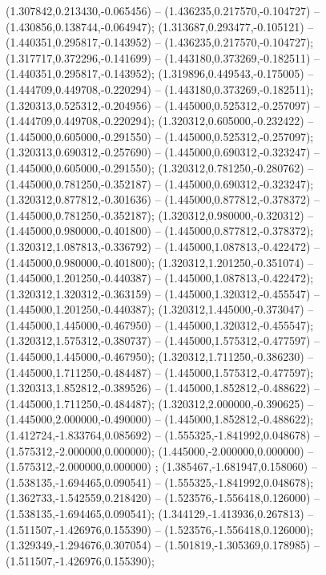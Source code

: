  (1.307842,0.213430,-0.065456) -- (1.436235,0.217570,-0.104727) -- (1.430856,0.138744,-0.064947);
 (1.313687,0.293477,-0.105121) -- (1.440351,0.295817,-0.143952) -- (1.436235,0.217570,-0.104727);
 (1.317717,0.372296,-0.141699) -- (1.443180,0.373269,-0.182511) -- (1.440351,0.295817,-0.143952);
 (1.319896,0.449543,-0.175005) -- (1.444709,0.449708,-0.220294) -- (1.443180,0.373269,-0.182511);
 (1.320313,0.525312,-0.204956) -- (1.445000,0.525312,-0.257097) -- (1.444709,0.449708,-0.220294);
 (1.320312,0.605000,-0.232422) -- (1.445000,0.605000,-0.291550) -- (1.445000,0.525312,-0.257097);
 (1.320313,0.690312,-0.257690) -- (1.445000,0.690312,-0.323247) -- (1.445000,0.605000,-0.291550);
 (1.320312,0.781250,-0.280762) -- (1.445000,0.781250,-0.352187) -- (1.445000,0.690312,-0.323247);
 (1.320312,0.877812,-0.301636) -- (1.445000,0.877812,-0.378372) -- (1.445000,0.781250,-0.352187);
 (1.320312,0.980000,-0.320312) -- (1.445000,0.980000,-0.401800) -- (1.445000,0.877812,-0.378372);
 (1.320312,1.087813,-0.336792) -- (1.445000,1.087813,-0.422472) -- (1.445000,0.980000,-0.401800);
 (1.320312,1.201250,-0.351074) -- (1.445000,1.201250,-0.440387) -- (1.445000,1.087813,-0.422472);
 (1.320312,1.320312,-0.363159) -- (1.445000,1.320312,-0.455547) -- (1.445000,1.201250,-0.440387);
 (1.320312,1.445000,-0.373047) -- (1.445000,1.445000,-0.467950) -- (1.445000,1.320312,-0.455547);
 (1.320312,1.575312,-0.380737) -- (1.445000,1.575312,-0.477597) -- (1.445000,1.445000,-0.467950);
 (1.320312,1.711250,-0.386230) -- (1.445000,1.711250,-0.484487) -- (1.445000,1.575312,-0.477597);
 (1.320313,1.852812,-0.389526) -- (1.445000,1.852812,-0.488622) -- (1.445000,1.711250,-0.484487);
 (1.320312,2.000000,-0.390625) -- (1.445000,2.000000,-0.490000) -- (1.445000,1.852812,-0.488622);
 (1.412724,-1.833764,0.085692) -- (1.555325,-1.841992,0.048678) -- (1.575312,-2.000000,0.000000);
 (1.445000,-2.000000,0.000000) -- (1.575312,-2.000000,0.000000) ;
 (1.385467,-1.681947,0.158060) -- (1.538135,-1.694465,0.090541) -- (1.555325,-1.841992,0.048678);
 (1.362733,-1.542559,0.218420) -- (1.523576,-1.556418,0.126000) -- (1.538135,-1.694465,0.090541);
 (1.344129,-1.413936,0.267813) -- (1.511507,-1.426976,0.155390) -- (1.523576,-1.556418,0.126000);
 (1.329349,-1.294676,0.307054) -- (1.501819,-1.305369,0.178985) -- (1.511507,-1.426976,0.155390);

